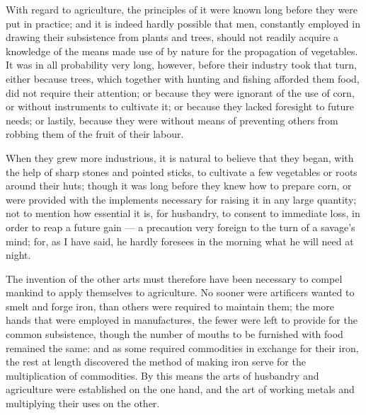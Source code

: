 \documentclass[12pt]{report}
\begin{document}
With regard to agriculture, the principles of it were known long before they were put in practice; and it is indeed hardly possible that men, constantly employed in drawing their subsistence from plants and trees, should not readily acquire a knowledge of the means made use of by nature for the propagation of vegetables. It was in all probability very long, however, before their industry took that turn, either because trees, which together with hunting and fishing afforded them food, did not require their attention; or because they were ignorant of the use of corn, or without instruments to cultivate it; or because they lacked foresight to future needs; or lastily, because they were without means of preventing others from robbing them of the fruit of their labour.

When they grew more industrious, it is natural to believe that they began, with the help of sharp stones and pointed sticks, to cultivate a few vegetables or roots around their huts; though it was long before they knew how to prepare corn, or were provided with the implements necessary for raising it in any large quantity; not to mention how essential it is, for husbandry, to consent to immediate loss, in order to reap a future gain — a precaution very foreign to the turn of a savage's mind; for, as I have said, he hardly foresees in the morning what he will need at night.

The invention of the other arts must therefore have been necessary to compel mankind to apply themselves to agriculture. No sooner were artificers wanted to smelt and forge iron, than others were required to maintain them; the more hands that were employed in manufactures, the fewer were left to provide for the common subsistence, though the number of mouths to be furnished with food remained the same: and as some required commodities in exchange for their iron, the rest at length discovered the method of making iron serve for the multiplication of commodities. By this means the arts of husbandry and agriculture were established on the one hand, and the art of working metals and multiplying their uses on the other.
\end{document}
